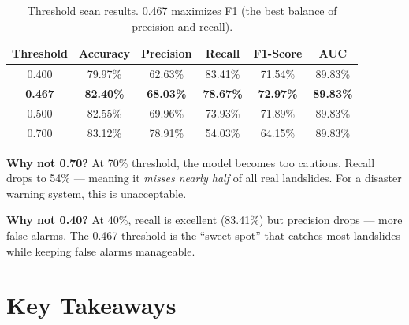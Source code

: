 \documentclass[11pt]{article}
\begin{document}
\begin{table}[H]
\centering
\begin{tabular}{@{}cccccc@{}}
\toprule
\textbf{Threshold} & \textbf{Accuracy} & \textbf{Precision} & \textbf{Recall} & \textbf{F1-Score} & \textbf{AUC} \\
\midrule
0.400 & 79.97\% & 62.63\% & 83.41\% & 71.54\% & 89.83\% \\
\rowcolor{bestgreen}
\textbf{0.467} & \textbf{82.40\%} & \textbf{68.03\%} & \textbf{78.67\%} & \textbf{72.97\%} & \textbf{89.83\%} \\
0.500 & 82.55\% & 69.96\% & 73.93\% & 71.89\% & 89.83\% \\
0.700 & 83.12\% & 78.91\% & 54.03\% & 64.15\% & 89.83\% \\
\bottomrule
\end{tabular}
\caption{Threshold scan results. 0.467 maximizes F1 (the best balance of precision and recall).}
\end{table}

\textbf{Why not 0.70?} At 70\% threshold, the model becomes too cautious. Recall drops to 54\% --- meaning it \emph{misses nearly half} of all real landslides. For a disaster warning system, this is unacceptable.

\textbf{Why not 0.40?} At 40\%, recall is excellent (83.41\%) but precision drops --- more false alarms. The 0.467 threshold is the ``sweet spot'' that catches most landslides while keeping false alarms manageable.

\section{Key Takeaways}
\end{document}

